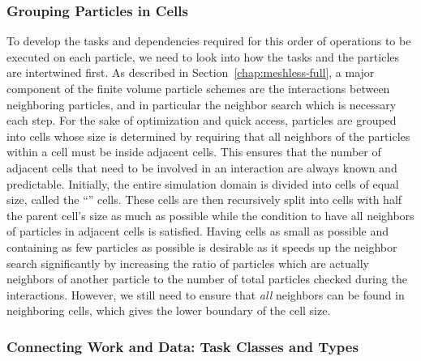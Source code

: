 \subsubsection{Grouping Particles in Cells}

To develop the tasks and dependencies required for this order of operations to be executed on each
particle, we need to look into how the tasks and the particles are intertwined first.
As described in Section~\ref{chap:meshless-full}, a major component of the finite volume particle
schemes are the interactions between neighboring particles, and in particular the neighbor search
which is necessary each step. For the sake of optimization and quick access, particles are grouped
into cells whose size is determined by requiring that all neighbors of the particles within a cell
must be inside adjacent cells. This ensures that the number of adjacent cells that need to be
involved in an interaction are always known and predictable. Initially, the entire simulation domain
is divided into cells of equal size, called the ``'' cells. These  cells are then recursively split into cells with half the parent cell's size as much as
possible while the condition to have all neighbors of particles in adjacent cells is satisfied.
Having cells as small as possible and containing as few particles as possible is desirable as it
speeds up the neighbor search significantly by increasing the ratio of particles which are actually
neighbors of another particle to the number of total particles checked during the interactions.
However, we still
need to ensure that \emph{all} neighbors can be found in neighboring cells, which gives the lower
boundary of the cell size.





\subsubsection{Connecting Work and Data: Task Classes and Types}

